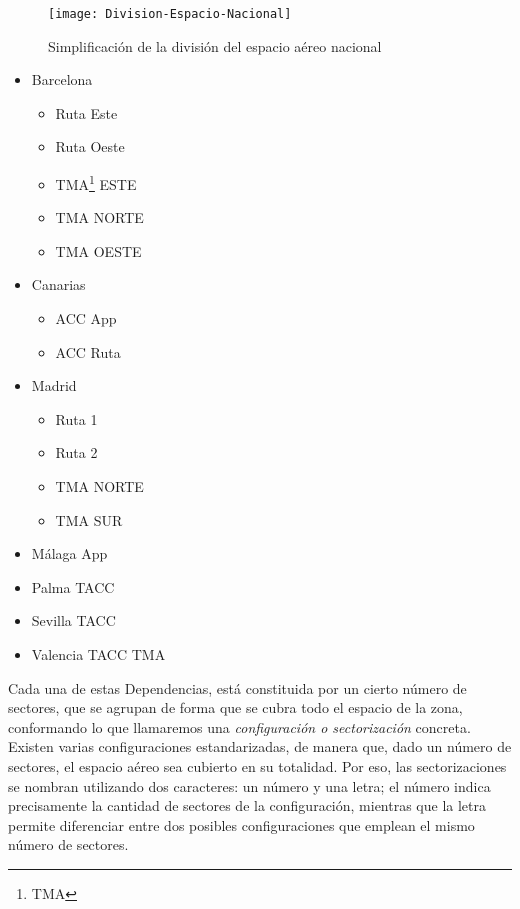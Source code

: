 \begin{figure}
    \centering
    \texttt{[image: Division-Espacio-Nacional]}
    \caption{Simplificación de la división del espacio aéreo nacional}
    \label{fig:2:regiones}
\end{figure}

\begin{itemize}
    \item Barcelona
    \begin{itemize}
        \item Ruta Este
        \item Ruta Oeste
        \item TMA\footnote{\acrlong{TMA}} ESTE
        \item TMA NORTE
        \item TMA OESTE
    \end{itemize}
    \item Canarias
    \begin{itemize}
        \item ACC App
        \item ACC Ruta
    \end{itemize}
    \item Madrid
    \begin{itemize}
        \item Ruta 1
        \item Ruta 2
        \item TMA NORTE
        \item TMA SUR
    \end{itemize}
    \item Málaga App
    \item Palma TACC
    \item Sevilla TACC
    \item Valencia TACC TMA
\end{itemize}

Cada una de estas Dependencias, está constituida por un cierto número de sectores, que se agrupan de forma que se cubra todo el espacio de la zona, conformando lo que llamaremos una \textit{configuración o sectorización} concreta.
Existen varias configuraciones estandarizadas, de manera que, dado un número de sectores, el espacio aéreo sea cubierto en su totalidad.
Por eso, las sectorizaciones se nombran utilizando dos caracteres: un número y una letra; el número indica precisamente la cantidad de sectores de la configuración, mientras que la letra permite diferenciar entre dos posibles 
configuraciones que emplean el mismo número de sectores.

